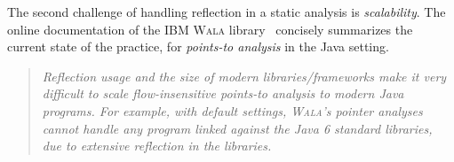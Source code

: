 The second challenge of handling reflection in a static analysis is
\emph{scalability}.  The online documentation of the IBM \textsc{Wala}
library~\cite{www:wala-reflection} concisely summarizes the current
state of the practice, for \emph{points-to analysis} in the Java
setting.

\begin{quote}
  \emph{Reflection usage and the size of modern libraries/frameworks
    make it very difficult to scale flow-insensitive points-to
    analysis to modern Java programs. For example, with default
    settings, \textsc{Wala}'s pointer analyses cannot handle any
    program linked against the Java 6 standard libraries, due to
    extensive reflection in the libraries.}
\end{quote}


%

